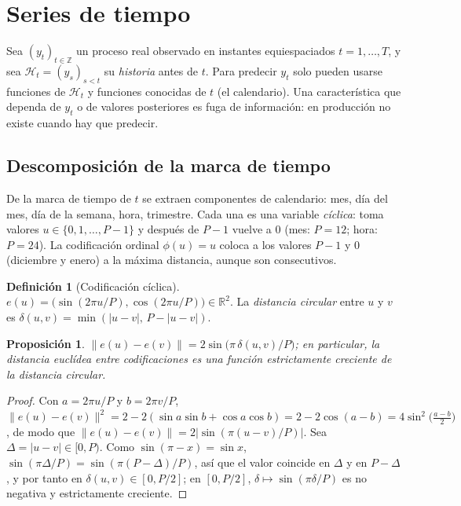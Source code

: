 \documentclass[11pt,a4paper]{article}
\theoremstyle{plain}
\newtheorem{proposicion}[teorema]{Proposición}
\theoremstyle{definition}
\newtheorem{definicion}[teorema]{Definición}
\theoremstyle{remark}
\newcommand{\R}{\mathbb{R}}
\newcommand{\Z}{\mathbb{Z}}
\newcommand{\1}{\mathbf{1}}
\begin{document}
\section{Series de tiempo}

Sea $(y_t)_{t\in\Z}$ un proceso real observado en instantes
equiespaciados $t=1,\dots,T$, y sea $\mathcal H_t=(y_s)_{s<t}$ su
\emph{historia} antes de $t$. Para predecir $y_t$ solo pueden usarse
funciones de $\mathcal H_t$ y funciones conocidas de $t$ (el calendario).
Una característica que dependa de $y_t$ o de valores posteriores es fuga de
información: en producción no existe cuando hay que predecir.

\subsection{Descomposición de la marca de tiempo}

De la marca de tiempo de $t$ se extraen componentes de calendario: mes,
día del mes, día de la semana, hora, trimestre. Cada una es una variable
\emph{cíclica}: toma valores $u\in\{0,1,\dots,P-1\}$ y después de $P-1$
vuelve a $0$ (mes: $P=12$; hora: $P=24$). La codificación ordinal
$\phi(u)=u$ coloca a los valores $P-1$ y $0$ (diciembre y enero) a la
máxima distancia, aunque son consecutivos.

\begin{definicion}[Codificación cíclica]
$e(u)=\bigl(\sin(2\pi u/P),\cos(2\pi u/P)\bigr)\in\R^2$. La
\emph{distancia circular} entre $u$ y $v$ es
$\delta(u,v)=\min(|u-v|,\,P-|u-v|)$.
\end{definicion}

\begin{proposicion}\label{prop:ciclica}
$\|e(u)-e(v)\|=2\sin\bigl(\pi\,\delta(u,v)/P\bigr)$; en particular, la
distancia euclídea entre codificaciones es una función estrictamente
creciente de la distancia circular.
\end{proposicion}

\begin{proof}
Con $a=2\pi u/P$ y $b=2\pi v/P$,
$\|e(u)-e(v)\|^2=2-2(\sin a\sin b+\cos a\cos b)=2-2\cos(a-b)=4\sin^2\bigl(\tfrac{a-b}2\bigr)$,
de modo que $\|e(u)-e(v)\|=2|\sin(\pi(u-v)/P)|$. Sea $\Delta=|u-v|\in[0,P)$.
Como $\sin(\pi-x)=\sin x$, $\sin(\pi\Delta/P)=\sin(\pi(P-\Delta)/P)$, así que
el valor coincide en $\Delta$ y en $P-\Delta$, y por tanto en
$\delta(u,v)\in[0,P/2]$; en $[0,P/2]$, $\delta\mapsto\sin(\pi\delta/P)$ es
no negativa y estrictamente creciente.
\end{proof}
\end{document}
